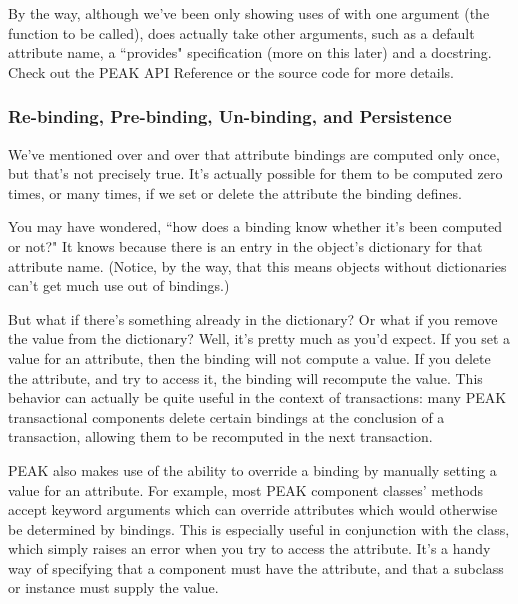 \begin{verbatim%
}
\begin{verbatim%
}
\begin{verbatim%
}
\begin{verbatim%
}
\begin{verbatim%
}
\begin{verbatim%
}
\begin{verbatim%
}
\begin{verbatim%
}
\begin{verbatim%
}
By the way, although we've been only showing uses of  with
one argument (the function to be called),  does actually
take other arguments, such as a default attribute name, a ``provides" 
specification (more on this later) and a docstring.  Check out the PEAK
API Reference or the source code for more details.






























\subsubsection{Re-binding, Pre-binding, Un-binding, and Persistence}

We've mentioned over and over that attribute bindings are computed only once,
but that's not precisely true.  It's actually possible for them to be computed
zero times, or many times, if we set or delete the attribute the binding
defines.

You may have wondered, ``how does a binding know whether it's been computed or
not?"  It knows because there is an entry in the object's dictionary for that
attribute name.  (Notice, by the way, that this means objects without
dictionaries can't get much use out of bindings.)

But what if there's something already in the dictionary?  Or what if you remove
the value from the dictionary?  Well, it's pretty much as you'd expect.  If you
set a value for an attribute, then the binding will not compute a value.  If
you delete the attribute, and try to access it, the binding will recompute the
value.  This behavior can actually be quite useful in the context of 
transactions: many PEAK transactional components delete certain bindings at the
conclusion of a transaction, allowing them to be recomputed in the next
transaction.

PEAK also makes use of the ability to override a binding by manually setting
a value for an attribute.  For example, most PEAK component classes'
 methods accept keyword arguments which can override attributes
which would otherwise be determined by bindings.  This is especially useful in
conjunction with the  class, which simply
raises an error when you try to access the attribute.  It's a handy way of
specifying that a component must have the attribute, and that a subclass or
instance must supply the value.


\end{verbatim%
}
\end{verbatim%
}
\end{verbatim%
}
\end{verbatim%
}
\end{verbatim%
}
\end{verbatim%
}
\end{verbatim%
}
\end{verbatim%
}
\end{verbatim%
}
